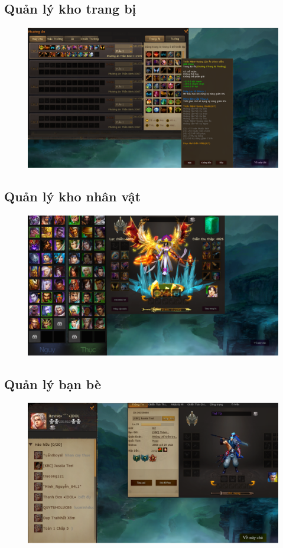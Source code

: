 \documentclass[3p]{elsarticle}
\begin{document}
\subsection{Quản lý kho trang bị}
\begin{figure}[!htbp]
	\centering
	\includegraphics[scale=.3]{images/items_management.pdf}
\end{figure}
\subsection{Quản lý kho nhân vật}
\begin{figure}[!htbp]
	\centering
	\includegraphics[scale=.3]{images/character_management.pdf}
\end{figure}
\newpage
\subsection{Quản lý bạn bè}
\begin{figure}[!htbp]
	\centering
	\includegraphics[scale=.3]{images/friend_management.pdf}
\end{figure}
\end{document}
